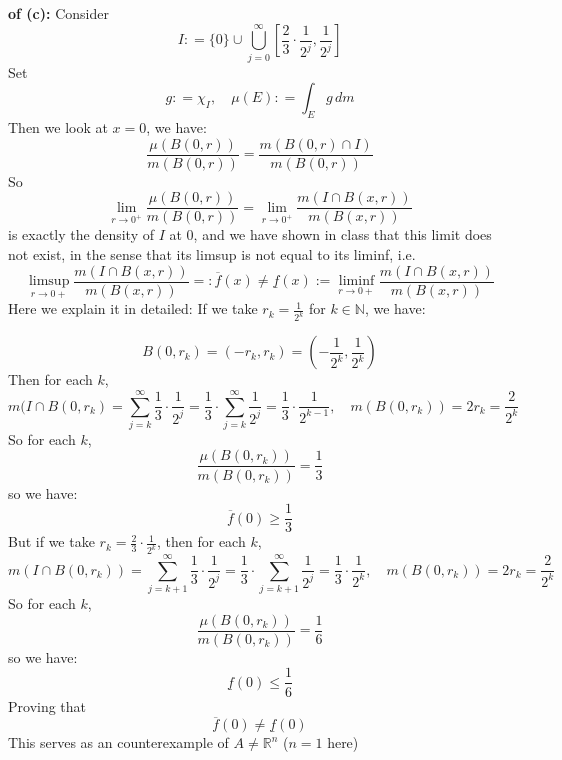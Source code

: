\documentclass[lang=cn,11pt]{elegantbook}
\begin{document}
\begin{example}
    \textbf{of (c):}
    Consider \[
    I : = \{0\} \cup \bigcup_{j=0}^\infty [\frac{2}{3} \cdot \frac{1}{2^j}, \frac{1}{2^j}]
    \]
    Set $$g: = \chi_I,\quad    \mu(E) : = \int_E g \, dm $$
    Then we look at $x = 0$, we have:  $$
\frac{\mu(B(0, r))}{m(B(0, r))}=\frac{m(B(0, r) \cap I)}{m(B(0, r))}
$$
    So \[
  \lim_{r\to 0^+} \frac{\mu(B(0, r))}{m(B(0, r))} =     \lim_{r\to 0^+} \frac{m(I \cap B(x,r))}{m(B(x,r))}  
    \] is exactly the density of $I$ at $0$, and we have shown in class that this limit does not exist, in the sense that its limsup is not equal to its liminf, i.e.  \[
    \limsup_{r\to0+}\frac{m(I \cap B(x,r))}{m(B(x,r))} =:  \overline f(x) \not =  
      \underline f(x):=\liminf_{r\to0+}\frac{m(I \cap B(x,r))}{m(B(x,r))}
    \]
Here we explain it in detailed: 
If we take $r_k=\frac{1}{2^k}$ for $k\in \mathbb{N}$, we have:

$$
B\left(0, r_k\right)=\left(-r_k, r_k\right)=\left(-\frac{1}{2^k}, \frac{1}{2^k}\right)
$$
Then for each $k$,  \[
m(I \cap B(0, r_k)=\sum_{j=k}^{\infty} \frac{1}{3} \cdot \frac{1}{2^j}=\frac{1}{3} \cdot \sum_{j=k}^{\infty} \frac{1}{2^j}=\frac{1}{3} \cdot \frac{1}{2^{k-1}},\quad m(B\left(0, r_k\right))=2 r_k=\frac{2}{2^k}
\]
So  for each $k$,  \[
\frac{\mu(B(0, r_k))}{m(B(0, r_k))}=\frac{1}{3}
\]
so we have: \[
  \overline f(0) \geq \frac{1}{3}
\]
But if we take $r_k = \frac{2}{3} \cdot \frac{1}{2^k}$, then for each $k$,  \[
m(I \cap B(0, r_k))=\sum_{j=k+1}^{\infty} \frac{1}{3} \cdot \frac{1}{2^j}=\frac{1}{3} \cdot \sum_{j=k+1}^{\infty} \frac{1}{2^j}=\frac{1}{3} \cdot \frac{1}{2^{k}},\quad m(B\left(0, r_k\right))=2 r_k=\frac{2}{2^k}
\]
So  for each $k$,  \[
\frac{\mu(B(0, r_k))}{m(B(0, r_k))}=\frac{1}{6}
\]
so we have: \[
  \underline f(0) \leq \frac{1}{6}
\]
Proving that \[
 \overline f(0) \not =   \underline f(0) 
\]
This serves as an counterexample of $A \not = \mathbb{R}^n$ ($n=1$ here)
\end{example}



  
\end{document}
